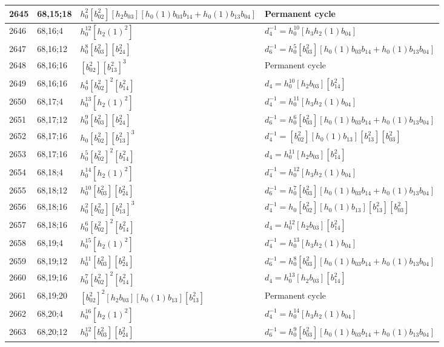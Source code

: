 \documentclass{article}
\begin{document}
\begin{longtable}{|l|l|>{\raggedright\arraybackslash}p{6cm}|>{\raggedright\arraybackslash}p{6cm}|}
\hline
2645 & 68,15;18 & $h_0^2[b_{02}^2][h_2b_{03}][h_0(1)b_{03}b_{14} + h_0(1)b_{13}b_{04}]$ & Permanent cycle\\
\hline
2646 & 68,16;4 & $h_0^{12}[h_2(1)^2]$ & $d_{4}^{-1}=h_0^{10}[h_3h_2(1)b_{04}]$\\
\hline
2647 & 68,16;12 & $h_0^8[b_{03}^2][b_{24}^2]$ & $d_{6}^{-1}=h_0^5[b_{03}^2][h_0(1)b_{03}b_{14} + h_0(1)b_{13}b_{04}]$\\
\hline
2648 & 68,16;16 & $[b_{02}^2][b_{13}^2]^3$ & Permanent cycle\\
2649 & 68,16;16 & $h_0^4[b_{02}^2]^2[b_{14}^2]$ &$d_{4}=h_0^{10}[h_2b_{03}][b_{14}^2]$\\
\hline
2650 & 68,17;4 & $h_0^{13}[h_2(1)^2]$ & $d_{4}^{-1}=h_0^{11}[h_3h_2(1)b_{04}]$\\
\hline
2651 & 68,17;12 & $h_0^9[b_{03}^2][b_{24}^2]$ & $d_{6}^{-1}=h_0^6[b_{03}^2][h_0(1)b_{03}b_{14} + h_0(1)b_{13}b_{04}]$\\
\hline
2652 & 68,17;16 & $h_0[b_{02}^2][b_{13}^2]^3$ & $d_{4}^{-1}=[b_{02}^2][h_0(1)b_{13}][b_{13}^2][b_{03}^2]$\\
2653 & 68,17;16 & $h_0^5[b_{02}^2]^2[b_{14}^2]$ &$d_{4}=h_0^{11}[h_2b_{03}][b_{14}^2]$\\
\hline
2654 & 68,18;4 & $h_0^{14}[h_2(1)^2]$ & $d_{4}^{-1}=h_0^{12}[h_3h_2(1)b_{04}]$\\
\hline
2655 & 68,18;12 & $h_0^{10}[b_{03}^2][b_{24}^2]$ & $d_{6}^{-1}=h_0^7[b_{03}^2][h_0(1)b_{03}b_{14} + h_0(1)b_{13}b_{04}]$\\
\hline
2656 & 68,18;16 & $h_0^2[b_{02}^2][b_{13}^2]^3$ & $d_{4}^{-1}=h_0[b_{02}^2][h_0(1)b_{13}][b_{13}^2][b_{03}^2]$\\
2657 & 68,18;16 & $h_0^6[b_{02}^2]^2[b_{14}^2]$ &$d_{4}=h_0^{12}[h_2b_{03}][b_{14}^2]$\\
\hline
2658 & 68,19;4 & $h_0^{15}[h_2(1)^2]$ & $d_{4}^{-1}=h_0^{13}[h_3h_2(1)b_{04}]$\\
\hline
2659 & 68,19;12 & $h_0^{11}[b_{03}^2][b_{24}^2]$ & $d_{6}^{-1}=h_0^8[b_{03}^2][h_0(1)b_{03}b_{14} + h_0(1)b_{13}b_{04}]$\\
\hline
2660 & 68,19;16 & $h_0^7[b_{02}^2]^2[b_{14}^2]$ &$d_{4}=h_0^{13}[h_2b_{03}][b_{14}^2]$\\
\hline
2661 & 68,19;20 & $[b_{02}^2]^2[h_2b_{03}][h_0(1)b_{13}][b_{13}^2]$ & Permanent cycle\\
\hline
2662 & 68,20;4 & $h_0^{16}[h_2(1)^2]$ & $d_{4}^{-1}=h_0^{14}[h_3h_2(1)b_{04}]$\\
\hline
2663 & 68,20;12 & $h_0^{12}[b_{03}^2][b_{24}^2]$ & $d_{6}^{-1}=h_0^9[b_{03}^2][h_0(1)b_{03}b_{14} + h_0(1)b_{13}b_{04}]$\\

\end{longtable}
\end{document}
